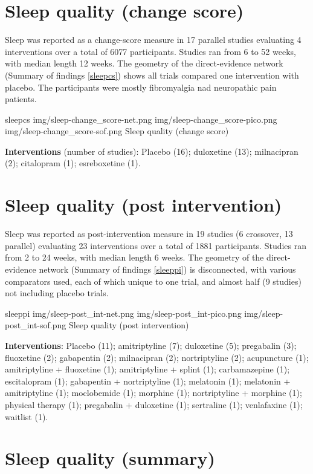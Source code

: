 \documentclass{report}\usepackage[]{graphicx}\usepackage[]{color}
\begin{document}
\section{Sleep quality (change score)}


Sleep was reported as a change-score measure in 17 parallel studies evaluating 4 interventions over a total of 6077 participants. Studies ran from 6 to 52 weeks, with median length 12 weeks. The geometry of the direct-evidence network (Summary of findings \ref{sleepcs}) shows all trials compared one intervention with placebo. The participants were mostly fibromyalgia nad neuropathic pain patients.

\soffignew
{sleepcs}
{img/sleep-change_score-net.png}
{img/sleep-change_score-pico.png}
{img/sleep-change_score-sof.png}
{Sleep quality (change score)}

\textbf{Interventions} (number of studies): Placebo (16); duloxetine (13); milnacipran (2); citalopram (1); esreboxetine (1).



\section{Sleep quality (post intervention)}


Sleep was reported as post-intervention measure in 19 studies (6 crossover, 13 parallel) evaluating 23 interventions over a total of 1881 participants. Studies ran from 2 to 24 weeks, with median length 6 weeks. The geometry of the direct-evidence network (Summary of findings \ref{sleeppi}) is disconnected, with various comparators used, each of which unique to one trial, and almost half (9 studies) not including placebo trials.

\soffignew
{sleeppi}
{img/sleep-post_int-net.png}
{img/sleep-post_int-pico.png}
{img/sleep-post_int-sof.png}
{Sleep quality (post intervention)}

\textbf{Interventions}: Placebo (11); amitriptyline (7); duloxetine (5); pregabalin (3); fluoxetine (2); gabapentin (2); milnacipran (2); nortriptyline (2); acupuncture (1); amitriptyline + fluoxetine (1); amitriptyline + splint (1); carbamazepine (1); escitalopram (1); gabapentin + nortriptyline (1); melatonin (1); melatonin + amitriptyline (1); moclobemide (1); morphine (1); nortriptyline + morphine (1); physical therapy (1); pregabalin + duloxetine (1); sertraline (1); venlafaxine (1); waitlist (1).

\section{Sleep quality (summary)}
\end{document}
